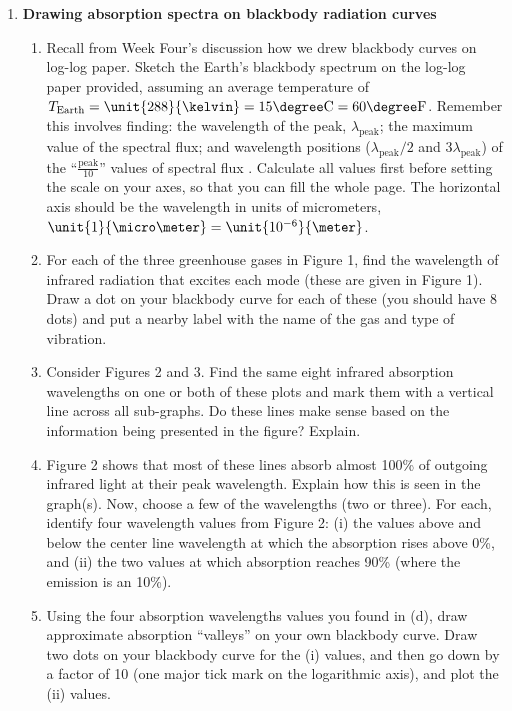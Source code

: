 \documentclass[12pt]{article}
\begin{document}
\begin{enumerate}
\item {\bf Drawing absorption spectra on blackbody radiation curves} 
	\begin{enumerate}
	\item Recall from Week Four's discussion how we drew blackbody curves on log-log paper.  Sketch the Earth's blackbody spectrum on the log-log paper provided, assuming an average temperature of $T_\text{Earth} = \unit{288}{\kelvin} = 15\degree\text{C} = 60\degree\text{F}$. Remember this involves finding: the wavelength of the peak, $\lambda_\text{peak}$; the maximum value of the spectral flux; and wavelength positions ($\lambda_\text{peak}/2$ and $3 \lambda_\text{peak}$) of the ``$\frac{\text{peak}}{10}$'' values of spectral flux .  Calculate all values first before setting the scale on your axes, so that you can fill the whole page. The horizontal axis should be the wavelength in units of  micrometers, $\unit{1}{\micro\meter} = \unit{10^{-6}}{\meter}$.
	\item For each of the three greenhouse gases in Figure 1, find the wavelength of infrared radiation that excites each mode (these are given in Figure 1).  Draw a dot on your blackbody curve for each of these (you should have 8 dots) and put a nearby label  with the name of the gas and type of vibration.
	\item Consider Figures 2 and 3.  Find the same eight infrared absorption wavelengths on one or both of these plots and mark them with a vertical line across all sub-graphs.  Do these lines make sense based on the information being presented in the figure? Explain. 
	\item Figure 2 shows that most of these lines absorb almost 100\% of outgoing infrared light at their peak wavelength.  Explain how this is seen in the graph(s).  Now, choose a few of the wavelengths (two or three).  For each, identify four wavelength values from Figure 2: (i) the values above and below the center line wavelength at which the absorption rises above 0\%, and (ii) the two values at which absorption reaches 90\% (where the emission is an 10\%).
	\item Using the four absorption wavelengths values you found in (d), draw approximate absorption ``valleys'' on your own blackbody curve.  Draw two dots on your blackbody curve for the (i) values, and then go down by a factor of 10 (one major tick mark on the logarithmic axis), and plot the (ii) values.
	\end{enumerate}
	
\newpage


\end{enumerate}
\end{document}
